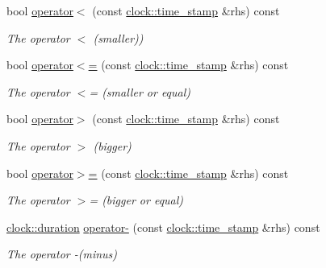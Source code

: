 \begin{DoxyCompactItemize}
bool \hyperlink{classclock_1_1time__stamp_a46d4e362864d480b5c9cf42d991739ff}{operator$<$} (const \hyperlink{classclock_1_1time__stamp}{clock\+::time\+\_\+stamp} \&rhs) const 
\begin{DoxyCompactList}\small\item\em The operator $<$ (smaller)) \end{DoxyCompactList}\item 
bool \hyperlink{classclock_1_1time__stamp_a0393b114366a2baf16a62f261b6cafd5}{operator$<$=} (const \hyperlink{classclock_1_1time__stamp}{clock\+::time\+\_\+stamp} \&rhs) const 
\begin{DoxyCompactList}\small\item\em The operator $<$= (smaller or equal) \end{DoxyCompactList}\item 
bool \hyperlink{classclock_1_1time__stamp_ac1983d286441e215831f84488b6498af}{operator$>$} (const \hyperlink{classclock_1_1time__stamp}{clock\+::time\+\_\+stamp} \&rhs) const 
\begin{DoxyCompactList}\small\item\em The operator $>$ (bigger) \end{DoxyCompactList}\item 
bool \hyperlink{classclock_1_1time__stamp_a9f1e89158a0c1e8aec3dcb8d33188382}{operator$>$=} (const \hyperlink{classclock_1_1time__stamp}{clock\+::time\+\_\+stamp} \&rhs) const 
\begin{DoxyCompactList}\small\item\em The operator $>$= (bigger or equal) \end{DoxyCompactList}\item 
\hyperlink{classclock_1_1duration}{clock\+::duration} \hyperlink{classclock_1_1time__stamp_a861a34b15786987747f131d11e000b4e}{operator-\/} (const \hyperlink{classclock_1_1time__stamp}{clock\+::time\+\_\+stamp} \&rhs) const 
\begin{DoxyCompactList}\small\item\em The operator -\/(minus) \end{DoxyCompactList}\end{DoxyCompactItemize}
